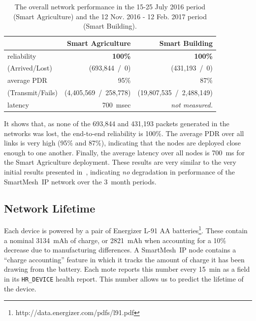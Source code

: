 \documentclass{elsarticle}
\newcommand{\smip}                {SmartMesh~IP\xspace}
\newcommand{\building}            {Smart Building\xspace}
\newcommand{\agri}                {Smart Agriculture\xspace}
\newcommand{\HRDEVICE}            {{\tt HR\_DEVICE}\xspace}
\newcommand{\PEACHNUMPCKTS}       {693,844\xspace}
\newcommand{\EVANUMPCKTS}         {431,193\xspace}
\begin{document}
\begin{table}
    \centering
    \begin{tabular}{|l|r|r|}
        \toprule
        {}                              & \agri                     & \building                    \\
        \midrule
        reliability                     & \textbf{100\%}            & \textbf{100\%}               \\
        (Arrived/Lost)                  & (\PEACHNUMPCKTS~/~0)      & (\EVANUMPCKTS~/~0)           \\
        \hline
        average PDR                     & 95\%                      &  87\%                        \\
        (Transmit/Fails)                & (4,405,569~/~258,778)     &  (19,807,535~/~2,488,149)    \\
        \hline
        latency                         & 700~msec                  &  \textit{not measured.}      \\
        \bottomrule
    \end{tabular}
    \caption{The overall network performance in the 15-25 July 2016 period (\agri) and the 12 Nov. 2016 - 12 Feb. 2017 period (\building).}
    \label{tab:net_stats}
\end{table}

It shows that, as none of the \PEACHNUMPCKTS and \EVANUMPCKTS packets generated in the networks was lost, the end-to-end reliability is 100\%.
The average PDR over all links is very high (95\% and 87\%), indicating that the nodes are deployed close enough to one another.
Finally, the average latency over all nodes is 700~ms for the \agri deployment.
These results are very similar to the very initial results presented in~\cite{watteyne16peach}, indicating \textit{no} degradation in performance of the \smip network over the 3~month periods.

\subsection{Network Lifetime}
\label{sec:lifetime}


Each device is powered by a pair of Energizer L-91 AA batteries\footnote{http://data.energizer.com/pdfs/l91.pdf}.
These contain a nominal 3134~mAh of charge, or 2821~mAh when accounting for a 10\% decrease due to manufacturing differences.
A \smip node contains a ``charge accounting'' feature in which it tracks the amount of charge it has been drawing from the battery.
Each mote reports this number every 15~min as a field in its \HRDEVICE health report.
This number allows us to predict the lifetime of the device.
\end{document}

